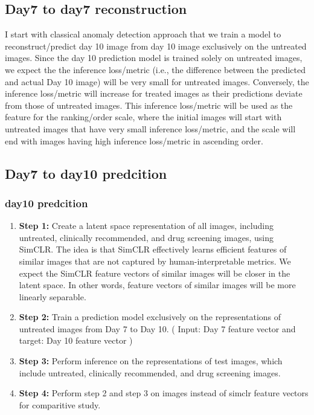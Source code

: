 \subsection{Day7 to day7 reconstruction}
I start with classical anomaly detection approach that we train a model to 
reconstruct/predict day 10 image from day 10 image exclusively on the untreated images. Since the day 10 prediction model is trained solely on untreated images,
 we expect the the inference loss/metric (i.e., the difference between the predicted and actual Day 10 image) will be very small for untreated images.
Conversely, the inference loss/metric will increase for treated images as their predictions deviate from those of untreated images.
 This inference loss/metric will be used as the feature for the ranking/order scale, where the initial images will start 
 with untreated images that have very small inference loss/metric, and the scale will end with images having high inference loss/metric in ascending order.


\subsection{Day7 to day10 predcition}
\subsubsection{day10 predcition}
\begin{enumerate}
    \item \textbf{Step 1:} Create a latent space representation of all images, including untreated, clinically recommended, 
    and drug screening images, using SimCLR. 
    The idea is that SimCLR effectively learns efficient features of similar images that are not captured by 
    human-interpretable metrics. We expect the SimCLR feature vectors of similar images will be closer in the latent space. 
    In other words, feature vectors of similar images will be more linearly separable.
  
  \item \textbf{Step 2:} Train a prediction model exclusively on the representations of 
  untreated images from Day 7 to Day 10. ( Input: Day 7 feature vector and target: Day 10 feature vector )

  
  \item \textbf{Step 3:} Perform inference on the representations of test images, which include untreated, clinically recommended, and drug screening images.
  \item \textbf{Step 4:} Perform step 2 and step 3 on images instead of simclr feature vectors for comparitive study.
\end{enumerate}

